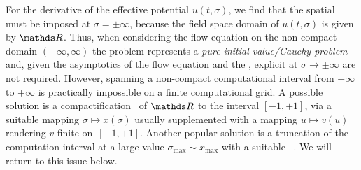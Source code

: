 For the derivative of the effective potential $u ( t, \sigma )$, we find that the spatial \bcs{} must be imposed at $\sigma = \pm \infty$, because the field space domain of $u ( t, \sigma )$ is given by $\Reals{}$.
Thus, when considering the flow equation on the non-compact domain $( - \infty, \infty )$ the problem represents a \textit{pure initial-value/Cauchy problem}~\cite{Ames:1992,LeVeque:1992,LeVeque:2002} and, given the asymptotics of the flow equation and the \ic{}, explicit \bcs{} at $\sigma\rightarrow\pm\infty$ are not required.
However, spanning a non-compact computational interval from $ - \infty$ to $ + \infty$ is practically impossible on a finite computational grid.
A possible solution is a compactification~\cite{Borchardt:2016pif} of $\Reals{}$ to the interval $[ - 1, + 1 ]$, via a suitable mapping $\sigma \mapsto x ( \sigma )$ usually supplemented with a mapping $u \mapsto v(u)$ rendering $v$ finite on~${[ - 1, + 1 ]}$.
Another popular solution is a truncation of the computation interval at a large value $\sigma_\text{max} \sim x_\mathrm{max}$ with a suitable \bc{}~\cite{Pangon:2009pj,Caillol:2012zz,Borchardt:2015rxa,Borchardt:2016pif}.
We will return to this issue below.


